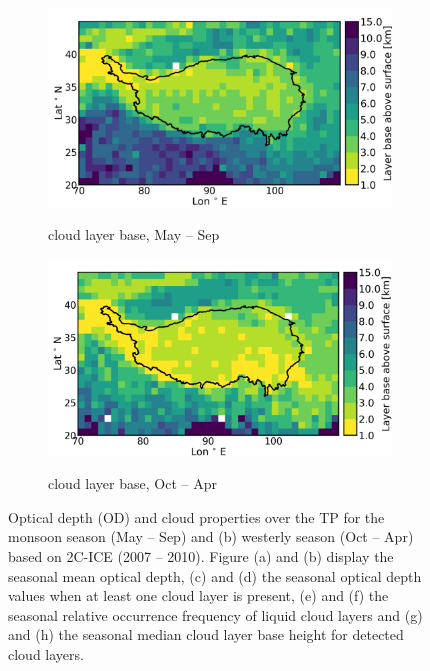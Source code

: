 \documentclass[alpha-refs]{wiley-article}
\begin{document}
\begin{figure}[!htbp]
   
        \begin{subfigure}[b]{0.5\textwidth}
       \centering
        \caption{cloud layer base, May -- Sep }       
        \includegraphics[width=\textwidth]{layerbase_median_monsoonseason.png}
        \label{fig:od7}
    \end{subfigure}%
    \begin{subfigure}[b]{0.5\textwidth}
        \centering
        \caption{cloud layer base, Oct -- Apr} 
        \includegraphics[width=\textwidth]{layerbase_median_westerlyseason.png}
       \label{fig:od8}
    \end{subfigure}   
    
    \caption{Optical depth (OD) and cloud properties over the TP for the monsoon season (May -- Sep) and (b) westerly season (Oct -- Apr) based on 2C-ICE (2007 – 2010).
    Figure (a) and (b) display the seasonal mean optical depth, (c) and (d) the seasonal optical depth values when at least one cloud layer is present, (e) and (f) the seasonal relative occurrence frequency of liquid cloud layers and (g) and (h) the seasonal median cloud layer base height for detected cloud layers.}
    \label{fig:od}
\end{figure}
\end{document}
